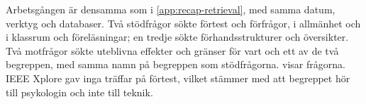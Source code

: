 Arbetsgången är densamma som i \cref{app:recap-retrieval}, med samma
datum, verktyg och databaser.  Två stödfrågor sökte förtest och
förfrågor, i allmänhet och i klassrum och föreläsningar; en tredje sökte
förhandsstrukturer och översikter.  Två motfrågor sökte uteblivna
effekter och gränser för vart och ett av de två begreppen, med samma
namn på begreppen som stödfrågorna.  
visar frågorna.  IEEE Xplore gav inga träffar på förtest, vilket
stämmer med att begreppet hör till psykologin och inte till teknik.

